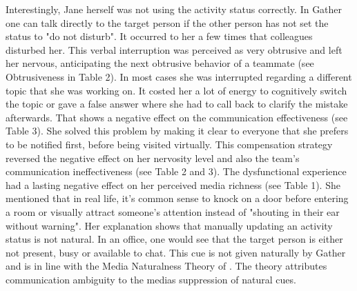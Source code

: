 \documentclass[man]{apa7}
\begin{document}
Interestingly, Jane herself was not using the activity status correctly. In Gather one can talk directly to the target person if the other person has not set the status to "do not disturb". It occurred to her a few times that colleagues disturbed her. This verbal interruption was perceived as very obtrusive and left her nervous, anticipating the next obtrusive behavior of a teammate (see Obtrusiveness in Table 2). In most cases she was interrupted regarding a different topic that she was working on. It costed her a lot of energy to cognitively switch the topic or gave a false answer where she had to call back to clarify the mistake afterwards. That shows a negative effect on the communication effectiveness (see Table 3). She solved this problem by making it clear to everyone that she prefers to be notified first, before being visited virtually. This compensation strategy reversed the negative effect on her nervosity level and also the team's communication ineffectiveness (see Table 2 and 3). The dysfunctional experience had a lasting negative effect on her perceived media richness (see Table 1). She mentioned that in real life, it's common sense to knock on a door before entering a room or visually attract someone's attention instead of "shouting in their ear without warning". Her explanation shows that manually updating an activity status is not natural. In an office, one would see that the target person is either not present, busy or available to chat. This cue is not given naturally by Gather and is in line with the Media Naturalness Theory of \parencite{Kock2005}. The theory attributes communication ambiguity to the medias suppression of natural cues.
\end{document}
